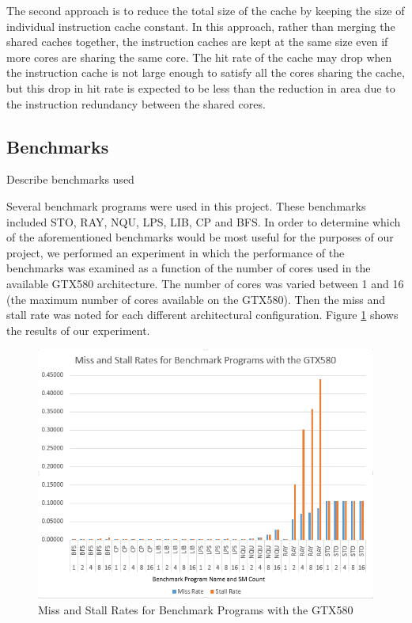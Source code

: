 The second approach is to reduce the total size of the cache by
keeping the size of individual instruction cache constant. 
In this approach, rather than merging the shared caches together, the
instruction caches are kept at the same size even if more cores are
sharing the same core. 
The hit rate of the cache may drop when the instruction cache is not
large enough to satisfy all the cores sharing the cache, but this drop
in hit rate is expected to be less than the reduction in area due to
the instruction redundancy between the shared cores.


\subsection{Benchmarks}
Describe benchmarks used 

Several benchmark programs were used in this project. 
These benchmarks included STO, RAY, NQU, LPS, LIB, CP and BFS. 
In order to determine which of the aforementioned benchmarks would be
most useful for the purposes of our project, we performed an
experiment in which the performance of the benchmarks was examined as
a function of the number of cores used in the available GTX580
architecture. 
The number of cores was varied between 1 and 16 (the maximum number of
cores available on the GTX580). 
Then the miss and stall rate was noted for each different
architectural configuration. 
Figure \ref{fig:missStalls} shows the results of our experiment. 

\begin{figure}[b!]
\centering
\includegraphics[width=\columnwidth]{graphics/miss_stalls_benchmarks.png}
\caption{Miss and Stall Rates for Benchmark Programs with the GTX580
}
\label{fig:missStalls}
\end{figure}

